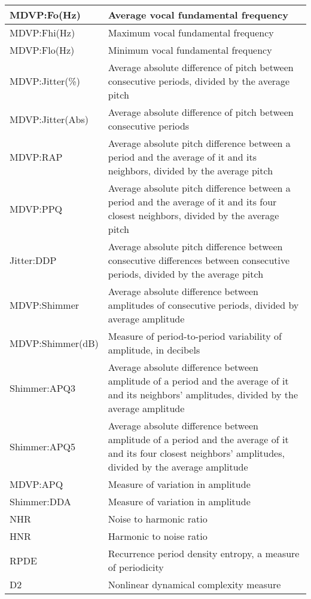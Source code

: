 \documentclass[draftcopy]{srpaper}
\begin{document}
\begin{table}
\begin{center}
\begin{tabular}{|l|p{10cm}|}
\hline

MDVP:Fo(Hz) &  Average vocal fundamental frequency \\ \hline
MDVP:Fhi(Hz) & Maximum vocal fundamental frequency \\ \hline
MDVP:Flo(Hz) & Minimum vocal fundamental frequency \\ \hline
MDVP:Jitter(\%) & Average absolute difference of pitch
between consecutive periods, divided by the average pitch\\ \hline
MDVP:Jitter(Abs) & Average absolute difference of pitch between
consecutive periods \\ \hline
MDVP:RAP & Average absolute pitch difference between a period and the
average of it and its neighbors, divided by the average pitch \\ \hline
MDVP:PPQ & Average absolute pitch difference between a period and the
average of it and its four closest neighbors, divided by the average pitch \\ \hline
Jitter:DDP & Average absolute pitch difference between consecutive
differences between consecutive periods, divided by the average pitch \\ \hline
MDVP:Shimmer & Average absolute difference between amplitudes of
consecutive periods, divided by average amplitude \\ \hline
MDVP:Shimmer(dB) & Measure of period-to-period variability of
amplitude, in decibels \\ \hline
Shimmer:APQ3 & Average absolute difference between amplitude of a
period and the average of it and its neighbors' amplitudes, divided by the
average amplitude \\ \hline
Shimmer:APQ5 & Average absolute difference between amplitude of a
period and the average of it and its four closest neighbors' amplitudes, divided by the
average amplitude \\ \hline
MDVP:APQ & Measure of variation in amplitude \\ \hline
Shimmer:DDA & Measure of variation in amplitude \\ \hline
NHR & Noise to harmonic ratio \\ \hline
HNR & Harmonic to noise ratio \\ \hline
RPDE & Recurrence period density entropy, a measure of periodicity \\ \hline
D2 & Nonlinear dynamical complexity measure \\ \hline

\end{tabular}
\end{center}
\end{table}
\end{document}
